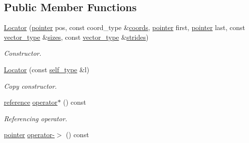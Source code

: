 \subsection*{Public Member Functions}
\begin{DoxyCompactItemize}
\item 
\hypertarget{class_d_o_1_1_locator_ab755eccc7041f74d284063d3f44068e9}{\hyperlink{class_d_o_1_1_locator_ab755eccc7041f74d284063d3f44068e9}{Locator} (\hyperlink{class_d_o_1_1_locator_aa2158dc2d25210ef557a40d3b8a521e3}{pointer} pos, const coord\-\_\-type \&\hyperlink{class_d_o_1_1_locator_a097d0e1275ad521eec770c654ae7c11a}{coords}, \hyperlink{class_d_o_1_1_locator_aa2158dc2d25210ef557a40d3b8a521e3}{pointer} first, \hyperlink{class_d_o_1_1_locator_aa2158dc2d25210ef557a40d3b8a521e3}{pointer} last, const \hyperlink{class_d_o_1_1_locator_aacf98e49e90f9aeead0ff8885fae3ac7}{vector\-\_\-type} \&\hyperlink{class_d_o_1_1_locator_a15f0ce2877b385c9505f042faa705694}{sizes}, const \hyperlink{class_d_o_1_1_locator_aacf98e49e90f9aeead0ff8885fae3ac7}{vector\-\_\-type} \&\hyperlink{class_d_o_1_1_locator_a5be6b48ede748b588c237552cbf3b6b8}{strides})}\label{class_d_o_1_1_locator_ab755eccc7041f74d284063d3f44068e9}

\begin{DoxyCompactList}\small\item\em Constructor. \end{DoxyCompactList}\item 
\hypertarget{class_d_o_1_1_locator_ac775564b41ff8e45a763c87708a3a295}{\hyperlink{class_d_o_1_1_locator_ac775564b41ff8e45a763c87708a3a295}{Locator} (const \hyperlink{class_d_o_1_1_locator_a2b4e7bf0649f420e5db026e79ac499be}{self\-\_\-type} \&l)}\label{class_d_o_1_1_locator_ac775564b41ff8e45a763c87708a3a295}

\begin{DoxyCompactList}\small\item\em Copy constructor. \end{DoxyCompactList}\item 
\hypertarget{class_d_o_1_1_locator_aa149c2249879e7727f33688b76bf2c99}{\hyperlink{class_d_o_1_1_locator_abaed3f9c23f38a6baedf841296fa931c}{reference} \hyperlink{class_d_o_1_1_locator_aa149c2249879e7727f33688b76bf2c99}{operator$\ast$} () const }\label{class_d_o_1_1_locator_aa149c2249879e7727f33688b76bf2c99}

\begin{DoxyCompactList}\small\item\em Referencing operator. \end{DoxyCompactList}\item 
\hypertarget{class_d_o_1_1_locator_a33ce448509e9cc0d73861e4c1919c7a7}{\hyperlink{class_d_o_1_1_locator_aa2158dc2d25210ef557a40d3b8a521e3}{pointer} \hyperlink{class_d_o_1_1_locator_a33ce448509e9cc0d73861e4c1919c7a7}{operator-\/$>$} () const }\label{class_d_o_1_1_locator_a33ce448509e9cc0d73861e4c1919c7a7}


\end{DoxyCompactItemize}
